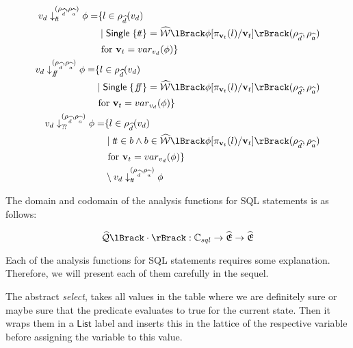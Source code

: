 \begin{align}
    \begin{split}
        v_d \downarrow_{\true}^{(\rho_{\ab{d}}, \rho_{\ab{a}})} \phi = &\{ l \in \rho_{\ab{d}}(v_d) \\
        &\mid \mathsf{Single} \; \{ \true \} = \abspredsem{\phi[\pi_{\mathbf{v}_t}(l)/\mathbf{v}_t]}(\rho_{\ab{d}}, \rho_{\ab{a}}) \\
        &\text{ for } \mathbf{v}_t = var_{v_d}(\phi) \}
    \end{split}\\
    \begin{split}
        v_d \downarrow_{\false}^{(\rho_{\ab{d}}, \rho_{\ab{a}})} \phi = &\{ l \in \rho_{\ab{d}}(v_d) \\
        &\mid \mathsf{Single} \; \{ \false \} = \abspredsem{\phi[\pi_{\mathbf{v}_t}(l)/\mathbf{v}_t]}(\rho_{\ab{d}}, \rho_{\ab{a}}) \\
        &\text{ for } \mathbf{v}_t = var_{v_d}(\phi) \}
    \end{split}\\
    \begin{split}
        v_d \downarrow_{\unknown}^{(\rho_{\ab{d}}, \rho_{\ab{a}})} \phi = &\{ l \in \rho_{\ab{d}}(v_d) \\
        &\mid \true \in b \land b \in \abspredsem{\phi[\pi_{\mathbf{v}_t}(l)/\mathbf{v}_t]}(\rho_{\ab{d}}, \rho_{\ab{a}}) \\
        &\text{ for } \mathbf{v}_t = var_{v_d}(\phi) \} \\
        &\setminus v_d \downarrow_{\true}^{(\rho_{\ab{d}}, \rho_{\ab{a}})} \phi
    \end{split}
\end{align}

The domain and codomain of the analysis functions for SQL statements is as follows:

\begin{equation}
    \abssqlsem{\cdot} : \mathbb{C}_{sql} \rightarrow \ab{\mathfrak{E}} \rightarrow \ab{\mathfrak{E}}\label{eq:equation-docomain-analysis}
\end{equation}

Each of the analysis functions for SQL statements requires some explanation.
Therefore, we will present each of them carefully in the sequel.

The abstract \textit{select}, takes all values in the table where we are definitely sure or maybe sure that the predicate evaluates to true for the current state.
Then it wraps them in a $\mathsf{List}$ label and inserts this in the lattice of the respective variable before assigning the variable to this value.


